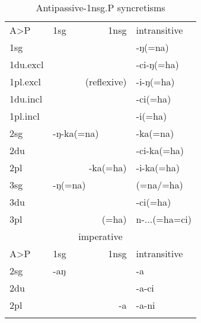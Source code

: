 \noindent
\begin{table}[htp!]
\begin{center}
\begin{tabular}{llll}
 \lsptoprule
 \multicolumn{4}{c}{{\sc indicative}}\\
		\midrule
	A>P	& 	{\sc 1sg}  &	 {\sc 1nsg}  & {\sc intransitive} \\
 \midrule
{\sc 1sg} 	&\multicolumn{2}{r}{}&-ŋ(=na)\\
{\sc 1du.excl}  	& \multicolumn{2}{r}{}&-ci-ŋ(=ha)\\
{\sc 1pl.excl}	 	&\multicolumn{2}{r}{(reflexive)}&-i-ŋ(=ha)\\
{\sc 1du.incl}  	& \multicolumn{2}{r}{}&-ci(=ha)\\
{\sc 1pl.incl}  	&	\multicolumn{2}{r}{}&-i(=ha)\\
  \midrule
{\sc 2sg}  	&	 -ŋ-ka(=na)&\cellcolor[gray]{.8}&\cellcolor[gray]{.8}-ka(=na)\\
{\sc 2du}  	&  \multicolumn{2}{r}{\cellcolor[gray]{.8}} &-ci-ka(=ha)\\
{\sc 2pl}	 	&  \multicolumn{2}{r}{\cellcolor[gray]{.8}-ka(=ha)} &-i-ka(=ha)\\
  \midrule			
{\sc 3sg} 	 		& -ŋ(=na)&\cellcolor[gray]{.8}&\cellcolor[gray]{.8}(=na/=ha)\\
{\sc 3du}	 	&   \multicolumn{2}{r}{\cellcolor[gray]{.8}} &-ci(=ha)\\
{\sc 3pl}	 	&  \multicolumn{2}{r}{\cellcolor[gray]{.8}(=ha)} &n-...(=ha=ci)\\
\midrule
 \multicolumn{4}{c}{{\sc imperative}} \\
\midrule
	A>P	& 	{\sc 1sg}  &	 {\sc 1nsg}  & {\sc intransitive} \\
\midrule
 {\sc 2sg} &-aŋ& \cellcolor[gray]{.8}&\cellcolor[gray]{.8}-a\\
 {\sc 2du} & \multicolumn{2}{r}{\cellcolor[gray]{.8}} &-a-ci\\
 {\sc 2pl}&\multicolumn{2}{r}{\cellcolor[gray]{.8}-a}& -a-ni\\
\lspbottomrule
\end{tabular}
\end{center}
\caption{Antipassive-{\sc 1nsg.P} syncretisms}\label{antip-tab}
\end{table}


